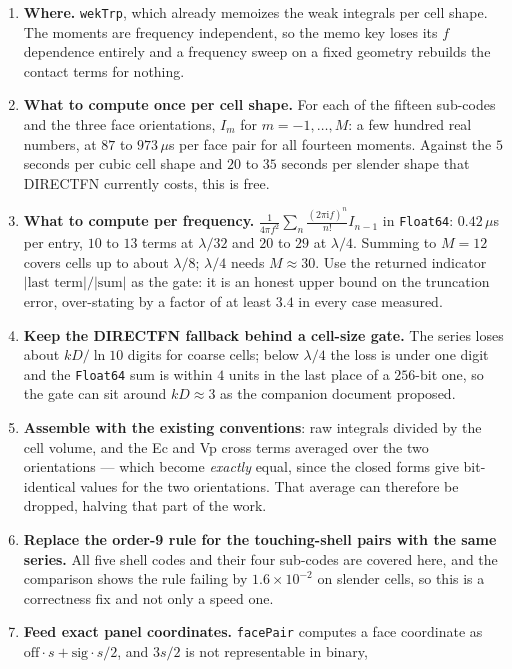 \documentclass[11pt]{article}
\theoremstyle{remark}
\newcommand{\ii}{\mathrm{i}}
\newcommand{\code}[1]{\texttt{#1}}
\begin{document}
\begin{enumerate}[nosep]
\item \textbf{Where.} \code{wekTrp}, which already memoizes the weak integrals per cell
shape. The moments are frequency independent, so the memo key loses its $f$ dependence
entirely and a frequency sweep on a fixed geometry rebuilds the contact terms for nothing.
\item \textbf{What to compute once per cell shape.} For each of the fifteen sub-codes and
the three face orientations, $I_m$ for $m = -1,\ldots,M$: a few hundred real numbers, at
$87$ to $973\,\mu$s per face pair for all fourteen moments. Against the $5$ seconds per
cubic cell shape and $20$ to $35$ seconds per slender shape that DIRECTFN currently costs,
this is free.
\item \textbf{What to compute per frequency.}
$\frac{1}{4\pi f^2}\sum_n \frac{(2\pi\ii f)^n}{n!}I_{n-1}$ in \code{Float64}: $0.42\,\mu$s
per entry, $10$ to $13$ terms at $\lambda/32$ and $20$ to $29$ at $\lambda/4$. Summing to
$M = 12$ covers cells up to about $\lambda/8$; $\lambda/4$ needs $M \approx 30$. Use the
returned indicator $|\text{last term}|/|\text{sum}|$ as the gate: it is an honest upper
bound on the truncation error, over-stating by a factor of at least $3.4$ in every case
measured.
\item \textbf{Keep the DIRECTFN fallback behind a cell-size gate.} The series loses about
$kD/\ln 10$ digits for coarse cells; below $\lambda/4$ the loss is under one digit and the
\code{Float64} sum is within $4$ units in the last place of a $256$-bit one, so the gate
can sit around $kD \approx 3$ as the companion document proposed.
\item \textbf{Assemble with the existing conventions}: raw integrals divided by the cell
volume, and the Ec and Vp cross terms averaged over the two orientations --- which become
\emph{exactly} equal, since the closed forms give bit-identical values for the two
orientations. That average can therefore be dropped, halving that part of the work.
\item \textbf{Replace the order-9 rule for the touching-shell pairs with the same series.}
All five shell codes and their four sub-codes are covered here, and the comparison shows
the rule failing by $1.6\times10^{-2}$ on slender cells, so this is a correctness fix and
not only a speed one.
\item \textbf{Feed exact panel coordinates.} \code{facePair} computes a face coordinate as
$\mathrm{off}\cdot s + \mathrm{sig}\cdot s/2$, and $3s/2$ is not representable in binary,

\end{enumerate}
\end{document}
